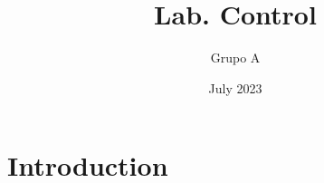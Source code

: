 \documentclass{article}
\title{Lab. Control}
\author{Grupo A}
\date{July 2023}
\begin{document}
\maketitle

\section{Introduction}
\end{document}
